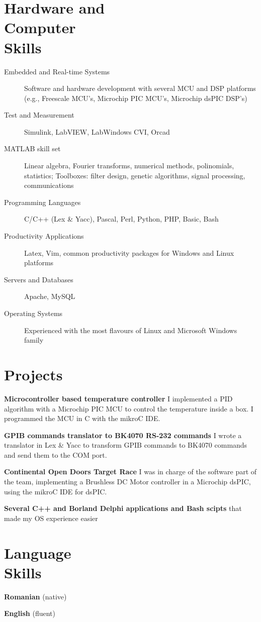 \documentclass[margin,line,a4paper]{resume}
\begin{document}
\begin{resume}
\section{\mysidestyle Hardware and\\Computer\\Skills}
	\begin{description}
		\item[Embedded and Real-time Systems] Software and hardware development with several MCU and DSP platforms (e.g., Freescale MCU's, Microchip PIC MCU's, Microchip dsPIC DSP's)
		\item[Test and Measurement] Simulink, LabVIEW, LabWindows CVI, Orcad
		\item[MATLAB skill set] Linear algebra, Fourier transforms, numerical methods, polinomials, statistics; Toolboxes: filter design, genetic algorithms, signal processing, communications
		\item[Programming Languages] C/C++ (Lex \& Yacc), Pascal, Perl, Python, PHP, Basic, Bash
		\item[Productivity Applications] Latex, Vim, common productivity packages for Windows and Linux platforms
		\item[Servers and Databases] Apache, MySQL
		\item[Operating Systems] Experienced with the most flavours of Linux and Microsoft Windows family
	\end{description}

\section{\mysidestyle Projects}
	\textbf{Microcontroller based temperature controller} I implemented a PID algorithm with a Microchip PIC MCU to control the temperature inside a box. I programmed the MCU in C with the mikroC IDE.
	
	\textbf{GPIB commands translator to BK4070 RS-232 commands} I wrote a translator in Lex \& Yacc to transform GPIB commands to BK4070 commands and send them to the COM port.
	
	\textbf{Continental Open Doors Target Race} I was in charge of the software part of the team, implementing a Brushless DC Motor controller in a Microchip dsPIC, using the mikroC IDE for dsPIC.
	
	\textbf{Several C++ and Borland Delphi applications and Bash scipts} that made my OS experience easier
	
\section{\mysidestyle Language\\Skills}
	\textbf{Romanian} (native)
	
	\textbf{English} (fluent)
\end{resume}
\end{document}
